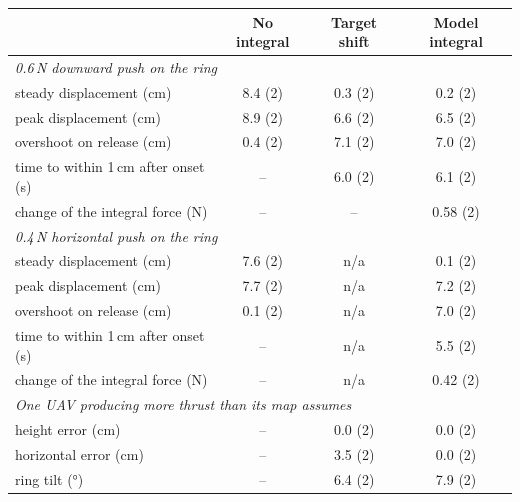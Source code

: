 \small
\begin{tabular}{lccc}
\toprule
 & No integral & Target shift & Model integral \\
\midrule
\multicolumn{4}{l}{\emph{0.6\,N downward push on the ring}} \\
\quad steady displacement (cm) & 8.4 (2) & 0.3 (2) & 0.2 (2) \\
\quad peak displacement (cm) & 8.9 (2) & 6.6 (2) & 6.5 (2) \\
\quad overshoot on release (cm) & 0.4 (2) & 7.1 (2) & 7.0 (2) \\
\quad time to within 1\,cm after onset (s) & -- & 6.0 (2) & 6.1 (2) \\
\quad change of the integral force (N) & -- & -- & 0.58 (2) \\
\midrule
\multicolumn{4}{l}{\emph{0.4\,N horizontal push on the ring}} \\
\quad steady displacement (cm) & 7.6 (2) & n/a & 0.1 (2) \\
\quad peak displacement (cm) & 7.7 (2) & n/a & 7.2 (2) \\
\quad overshoot on release (cm) & 0.1 (2) & n/a & 7.0 (2) \\
\quad time to within 1\,cm after onset (s) & -- & n/a & 5.5 (2) \\
\quad change of the integral force (N) & -- & n/a & 0.42 (2) \\
\midrule
\multicolumn{4}{l}{\emph{One UAV producing more thrust than its map assumes}} \\
\quad height error (cm) & -- & 0.0 (2) & 0.0 (2) \\
\quad horizontal error (cm) & -- & 3.5 (2) & 0.0 (2) \\
\quad ring tilt (\si{\degree}) & -- & 6.4 (2) & 7.9 (2) \\
\bottomrule
\end{tabular}
